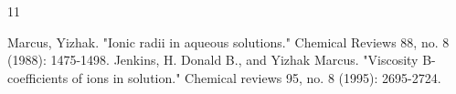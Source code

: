 \documentclass[11pt]{article}
\begin{document}
\begin{thebibliography}{11}

	 Marcus, Yizhak. "Ionic radii in aqueous solutions." Chemical Reviews 88, no. 8 (1988): 1475-1498.
	 Jenkins, H. Donald B., and Yizhak Marcus. "Viscosity B-coefficients of ions in solution." Chemical reviews 95, no. 8 (1995): 2695-2724.

\end{thebibliography}
\end{document}
